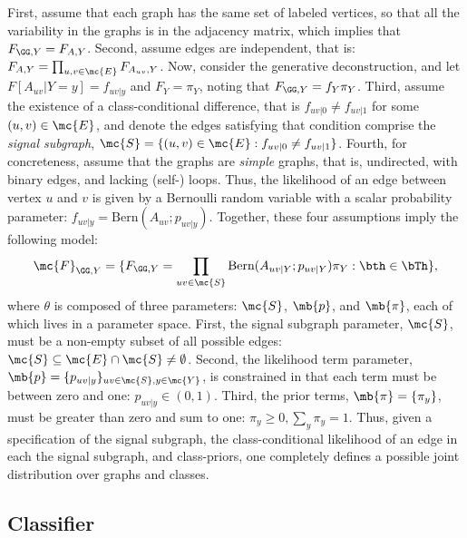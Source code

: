 \documentclass[10pt,journal,cspaper,compsoc]{IEEEtran}
\begin{document}
First,  assume that each graph has the same set of labeled vertices, so that all the variability in the graphs is in the adjacency matrix, which implies that $F_{\GG,Y}=F_{A,Y}$. Second, assume edges are independent, that is: $F_{A,Y}=\prod_{u,v \in \mc{E}} F_{A_{uv},Y}$.  Now, consider the generative deconstruction, and let $F[A_{uv} | Y=y]=f_{uv|y}$ and $F_Y=\pi_Y$,  noting that $F_{\GG,Y}=f_Y \pi_Y$.  Third, assume the existence of a class-conditional difference, that is $f_{uv|0} \neq f_{uv|1}$ for some $(u,v) \in \mc{E}$, and denote the edges satisfying that condition comprise the \emph{signal subgraph}, $\mc{S}=\{(u,v) \in \mc{E}: f_{uv|0} \neq f_{uv|1}\}$.  Fourth, for concreteness, assume that the graphs are \emph{simple} graphs, that is, undirected, with binary edges, and lacking (self-) loops.  Thus, the likelihood of an edge between vertex $u$ and $v$ is given by a Bernoulli random variable with a scalar probability parameter:  $f_{uv|y}=\text{Bern}(A_{uv}; p_{uv|y})$. Together, these four assumptions imply the following model: 
\begin{align}
\mc{F}_{\GG,Y}=\{F_{\GG, Y}=\prod_{uv \in \mc{S}} \text{Bern}(A_{uv|Y}; p_{uv|Y}) \pi_Y :  \bth \in \bTh\},
\end{align}
where $\theta$ is composed of three parameters: $\mc{S}$, $\mb{p}$, and $\mb{\pi}$, each of which lives in a parameter space.  First, the signal subgraph parameter, $\mc{S}$, must be a non-empty subset of all possible edges: $\mc{S} \subseteq \mc{E} \cap \mc{S} \neq \emptyset$.   Second, the likelihood term parameter, $\mb{p}=\{p_{uv|y}\}_{uv \in \mc{S}, y \in \mc{Y}}$, is constrained in that each term must be between zero and one: $p_{uv|y} \in (0,1)$.  Third, the prior terms, $\mb{\pi}=\{\pi_y\}$, must be greater than zero and sum to one: $\pi_y \geq 0, \sum_y \pi_y=1$.  Thus, given a specification of the signal subgraph, the class-conditional likelihood of an edge in each the signal subgraph, and class-priors, one completely defines a possible joint distribution over graphs and classes.



\subsection{Classifier} %
\label{sub:classifier}
\end{document}
